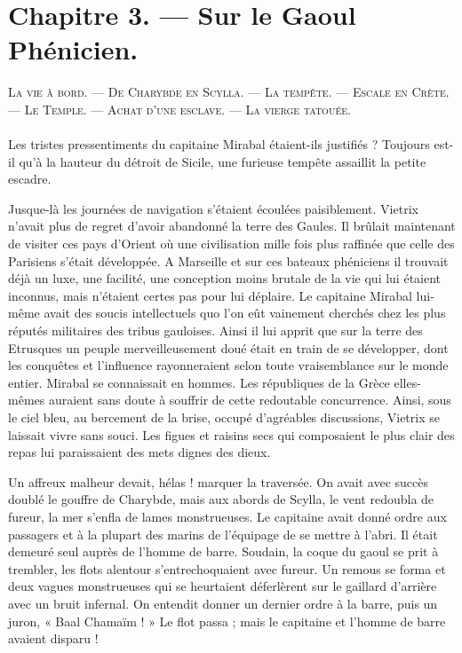\documentclass[a4paper, 11pt, oneside, polutonikogreek, french]{article}
\begin{document}
\section{Chapitre 3. --- Sur le Gaoul Phénicien.}
\begin{center}
\scshape
\small
La vie à bord. --- De Charybde en Scylla. --- La tempête. --- Escale en Crète. --- Le Temple. --- Achat d'une esclave. --- La vierge tatouée.
\end{center}
\paragraph{}
Les tristes pressentiments du capitaine Mirabal étaient-ils justifiés ? Toujours est-il qu'à la hauteur du détroit de Sicile, une furieuse tempête assaillit la petite escadre.

Jusque-là les journées de navigation s'étaient écoulées paisiblement. Vietrix n'avait plus de regret d'avoir abandonné la terre des Gaules. Il brûlait maintenant de visiter ces pays d'Orient où une civilisation mille fois plus raffinée que celle des Parisiens s'était développée. A Marseille et sur ces bateaux phéniciens il trouvait déjà un luxe, une facilité, une conception moins brutale de la vie qui lui étaient inconnus, mais n'étaient certes pas pour lui déplaire. Le capitaine Mirabal lui-même avait des soucis intellectuels quo l'on eût vainement cherchés chez les plus réputés militaires des tribus gauloises. Ainsi il lui apprit que sur la terre des Etrusques un peuple merveilleusement doué était en train de se développer, dont les conquêtes et l'influence rayonneraient selon toute vraisemblance sur le monde entier. Mirabal se connaissait en hommes. Les républiques de la Grèce elles-mêmes auraient sans doute à souffrir de cette redoutable concurrence. Ainsi, sous le ciel bleu, au bercement de la brise, occupé d'agréables discussions, Vietrix se laissait vivre sans souci. Les figues et raisins secs qui composaient le plus clair des repas lui paraissaient des mets dignes des dieux.

\bigskip
\centerline{\EightStarTaper}
\centerline{\EightStarTaper\EightStarTaper}
\bigskip

Un affreux malheur devait, hélas ! marquer la traversée. On avait avec succès doublé le gouffre de Charybde, mais aux abords de Scylla, le vent redoubla de fureur, la mer s'enfla de lames monstrueuses. Le capitaine avait donné ordre aux passagers et à la plupart des marins de l'équipage de se mettre à l'abri. Il était demeuré seul auprès de l'homme de barre. Soudain, la coque du gaoul se prit à trembler, les flots alentour s'entrechoquaient avec fureur. Un remous se forma et deux vagues monstrueuses qui se heurtaient déferlèrent sur le gaillard d'arrière avec un bruit infernal. On entendit donner un dernier ordre à la barre, puis un juron, « Baal Chamaïm ! » Le flot passa ; mais le capitaine et l'homme de barre avaient disparu !
\end{document}
